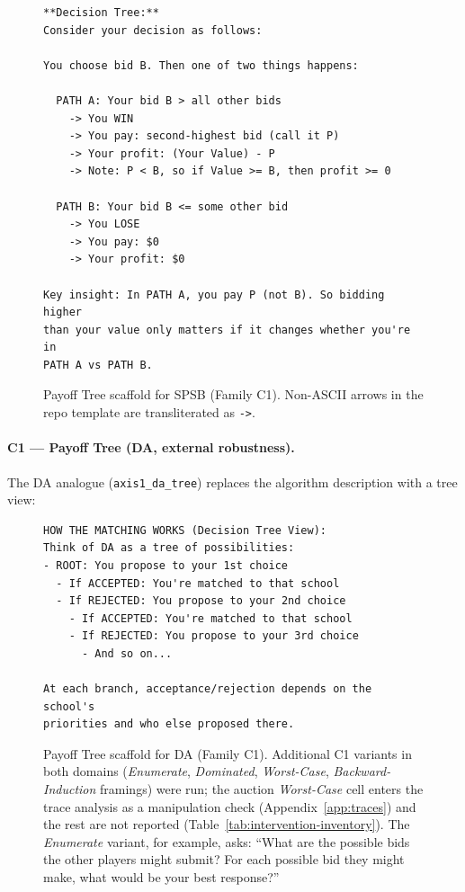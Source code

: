 \begin{figure}[H]
\begin{lstlisting}
**Decision Tree:**
Consider your decision as follows:

You choose bid B. Then one of two things happens:

  PATH A: Your bid B > all other bids
    -> You WIN
    -> You pay: second-highest bid (call it P)
    -> Your profit: (Your Value) - P
    -> Note: P < B, so if Value >= B, then profit >= 0

  PATH B: Your bid B <= some other bid
    -> You LOSE
    -> You pay: $0
    -> Your profit: $0

Key insight: In PATH A, you pay P (not B). So bidding higher
than your value only matters if it changes whether you're in
PATH A vs PATH B.
\end{lstlisting}
\caption{Payoff Tree scaffold for SPSB (Family C1). Non-ASCII arrows in the repo template are transliterated as \texttt{->}.}
\label{fig:prompt-tree-auction}
\end{figure}

\paragraph{C1 --- Payoff Tree (DA, external robustness).} The DA analogue (\texttt{axis1\_da\_tree}) replaces the algorithm description with a tree view:

\begin{figure}[H]
\begin{lstlisting}
HOW THE MATCHING WORKS (Decision Tree View):
Think of DA as a tree of possibilities:
- ROOT: You propose to your 1st choice
  - If ACCEPTED: You're matched to that school
  - If REJECTED: You propose to your 2nd choice
    - If ACCEPTED: You're matched to that school
    - If REJECTED: You propose to your 3rd choice
      - And so on...

At each branch, acceptance/rejection depends on the school's
priorities and who else proposed there.
\end{lstlisting}
\caption{Payoff Tree scaffold for DA (Family C1). Additional C1 variants in both domains (\emph{Enumerate}, \emph{Dominated}, \emph{Worst-Case}, \emph{Backward-Induction} framings) were run; the auction \emph{Worst-Case} cell enters the trace analysis as a manipulation check (Appendix~\ref{app:traces}) and the rest are not reported (Table~\ref{tab:intervention-inventory}). The \emph{Enumerate} variant, for example, asks: ``What are the possible bids the other players might submit? For each possible bid they might make, what would be your best response?''}
\label{fig:prompt-tree-da}
\end{figure}


